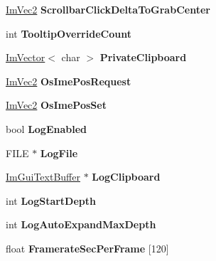 \begin{DoxyCompactItemize}
\hyperlink{struct_im_vec2}{Im\+Vec2} {\bfseries Scrollbar\+Click\+Delta\+To\+Grab\+Center}
\item 
\mbox{\label{struct_im_gui_context_a1c6e3c1b866fa1abf473d3cd9eafce0f}} 
int {\bfseries Tooltip\+Override\+Count}
\item 
\mbox{\label{struct_im_gui_context_a4ba950183c7c5e401ca4113e09b1ced4}} 
\hyperlink{class_im_vector}{Im\+Vector}$<$ char $>$ {\bfseries Private\+Clipboard}
\item 
\mbox{\label{struct_im_gui_context_af98a8f8b9c96bf8b692449daedf45602}} 
\hyperlink{struct_im_vec2}{Im\+Vec2} {\bfseries Os\+Ime\+Pos\+Request}
\item 
\mbox{\label{struct_im_gui_context_a466a0975ad72e7e3deaea6bcfb6b446d}} 
\hyperlink{struct_im_vec2}{Im\+Vec2} {\bfseries Os\+Ime\+Pos\+Set}
\item 
\mbox{\label{struct_im_gui_context_a2508bec1862aa4477eca2c79d6924b82}} 
bool {\bfseries Log\+Enabled}
\item 
\mbox{\label{struct_im_gui_context_a73a73a599720fb933e4fb5e673dde131}} 
F\+I\+LE $\ast$ {\bfseries Log\+File}
\item 
\mbox{\label{struct_im_gui_context_a676007461d3ce20e50a092573dc05064}} 
\hyperlink{struct_im_gui_text_buffer}{Im\+Gui\+Text\+Buffer} $\ast$ {\bfseries Log\+Clipboard}
\item 
\mbox{\label{struct_im_gui_context_a6ac157821b3a0eb9d0411bc477df8665}} 
int {\bfseries Log\+Start\+Depth}
\item 
\mbox{\label{struct_im_gui_context_a153d8c6eee2acdd3676ca55aec7b1079}} 
int {\bfseries Log\+Auto\+Expand\+Max\+Depth}
\item 
\mbox{\label{struct_im_gui_context_aca772ab262c0094e8bbe7eae215fc23b}} 
float {\bfseries Framerate\+Sec\+Per\+Frame} \mbox{[}120\mbox{]}
\item 
\mbox{\label{struct_im_gui_context_a64a96ad72dd7009dba134f6214a4936e}} 

\end{DoxyCompactItemize}
